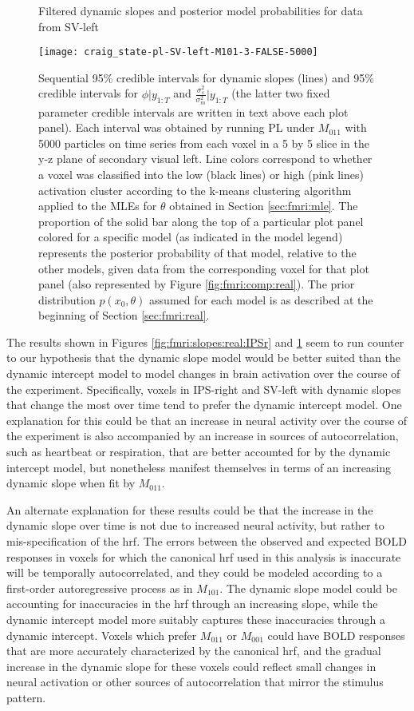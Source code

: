 \begin{figure}
\ssp
\centering
\caption{Filtered dynamic slopes and posterior model probabilities for data from SV-left} \label{fig:fmri:slopes:real}
\texttt{[image: craig\_state-pl-SV-left-M101-3-FALSE-5000]}
\caption*{Sequential 95\% credible intervals for dynamic slopes (lines) and 95\% credible intervals for $\phi|y_{1:T}$ and $\frac{\sigma^2_s}{\sigma^2_m}|y_{1:T}$ (the latter two fixed parameter credible intervals are written in text above each plot panel). Each interval was obtained by running PL under $M_{011}$ with 5000 particles on time series from each voxel in a 5 by 5 slice in the y-z plane of secondary visual left. Line colors correspond to whether a voxel was classified into the low (black lines) or high (pink lines) activation cluster according to the k-means clustering algorithm applied to the MLEs for $\theta$ obtained in Section \ref{sec:fmri:mle}. The proportion of the solid bar along the top of a particular plot panel colored for a specific model (as indicated in the model legend) represents the posterior probability of that model, relative to the other models, given data from the corresponding voxel for that plot panel (also represented by Figure \ref{fig:fmri:comp:real}). The prior distribution $p(x_0,\theta)$ assumed for each model is as described at the beginning of Section \ref{sec:fmri:real}.}
\end{figure}

The results shown in Figures \ref{fig:fmri:slopes:real:IPSr} and \ref{fig:fmri:slopes:real} seem to run counter to our hypothesis that the dynamic slope model would be better suited than the dynamic intercept model to model changes in brain activation over the course of the experiment. Specifically, voxels in IPS-right and SV-left with dynamic slopes that change the most over time tend to prefer the dynamic intercept model. One explanation for this could be that an increase in neural activity over the course of the experiment is also accompanied by an increase in sources of autocorrelation, such as heartbeat or respiration, that are better accounted for by the dynamic intercept model, but nonetheless manifest themselves in terms of an increasing dynamic slope when fit by $M_{011}$.

An alternate explanation for these results could be that the increase in the dynamic slope over time is not due to increased neural activity, but rather to mis-specification of the hrf. The errors between the observed and expected BOLD responses in voxels for which the canonical hrf used in this analysis is inaccurate will be temporally autocorrelated, and they could be modeled according to a first-order autoregressive process as in $M_{101}$. The dynamic slope model could be accounting for inaccuracies in the hrf through an increasing slope, while the dynamic intercept model more suitably captures these inaccuracies through a dynamic intercept. Voxels which prefer $M_{011}$ or $M_{001}$ could have BOLD responses that are more accurately characterized by the canonical hrf, and the gradual increase in the dynamic slope for these voxels could reflect small changes in neural activation or other sources of autocorrelation that mirror the stimulus pattern.

